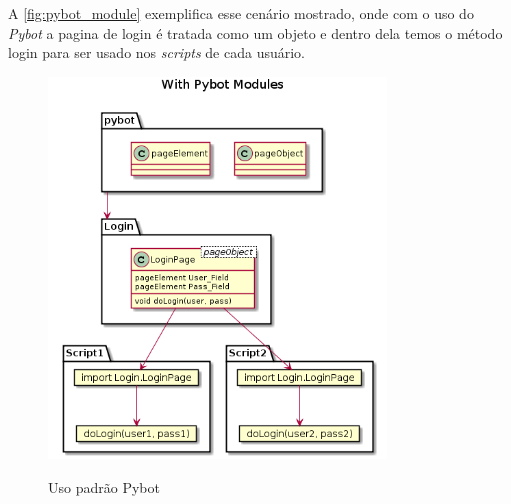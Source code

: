     A \autoref{fig:pybot_module} exemplifica esse cenário mostrado, onde com o uso do \emph{Pybot} a pagina de login
    é tratada como um objeto e dentro dela temos o método login para ser usado nos \emph{scripts} de cada usuário.

    \begin{figure}[H]
        \vspace*{0,3cm}
        \centering
        \caption{Uso padrão Pybot}
        \includegraphics[width=0.8\textwidth]{./04-figuras/page_object_pybot}
        \label{fig:pybot_module}
    \end{figure}
    \vspace*{-0,9cm}
    {\raggedright {}}
